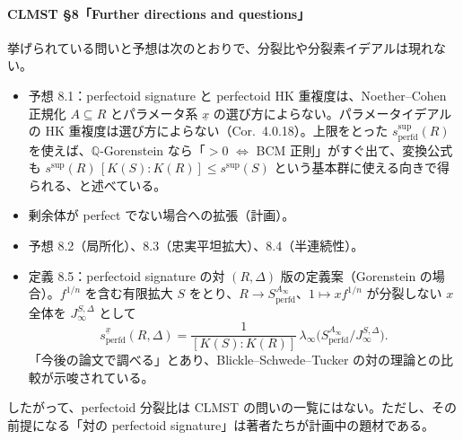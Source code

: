 \documentclass[11pt,a4paper]{ltjsarticle}
\theoremstyle{plain}
\theoremstyle{definition}
\theoremstyle{remark}
\theoremstyle{plain}
\begin{document}
\paragraph{CLMST §8「Further directions and questions」}
挙げられている問いと予想は次のとおりで、分裂比や分裂素イデアルは現れない。
\begin{itemize}
  \item 予想 8.1：perfectoid signature と perfectoid HK 重複度は、Noether--Cohen 正規化 $A\subseteq R$ とパラメータ系 $\underline{x}$ の選び方によらない。パラメータイデアルの HK 重複度は選び方によらない（Cor.~4.0.18）。上限をとった $s^{\sup}_{\mathrm{perfd}}(R)$ を使えば、$\mathbb{Q}$-Gorenstein なら「$>0$ $\Leftrightarrow$ BCM 正則」がすぐ出て、変換公式も $s^{\sup}(R)\,[K(S):K(R)]\le s^{\sup}(S)$ という基本群に使える向きで得られる、と述べている。
  \item 剰余体が perfect でない場合への拡張（計画）。
  \item 予想 8.2（局所化）、8.3（忠実平坦拡大）、8.4（半連続性）。
  \item 定義 8.5：perfectoid signature の対 $(R,\Delta)$ 版の定義案（Gorenstein の場合）。$f^{1/n}$ を含む有限拡大 $S$ をとり、$R\to S^{A_\infty}_{\mathrm{perfd}}$、$1\mapsto xf^{1/n}$ が分裂しない $x$ 全体を $J^{S,\Delta}_\infty$ として
  \[
    s^{\underline{x}}_{\mathrm{perfd}}(R,\Delta) = \frac{1}{[K(S):K(R)]}\,\lambda_\infty\bigl(S^{A_\infty}_{\mathrm{perfd}}/J^{S,\Delta}_\infty\bigr).
  \]
  「今後の論文で調べる」とあり、Blickle--Schwede--Tucker の対の理論との比較が示唆されている。
\end{itemize}
したがって、perfectoid 分裂比は CLMST の問いの一覧にはない。ただし、その前提になる「対の perfectoid signature」は著者たちが計画中の題材である。
\end{document}
